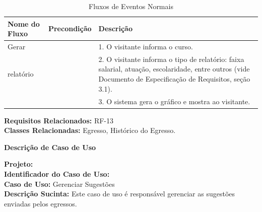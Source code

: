 \begin{table}[h]
	\centering \vspace{0.5cm} \footnotesize
	\caption{Fluxos de Eventos Normais}
	\begin{tabular}{|p{2.3cm}|p{1.8cm}|p{10.7cm}|} \hline  \rowcolor[rgb]{0.8,0.8,0.8}
 					
 		Nome do Fluxo & Precondição & Descrição  \\ \hline		
					
		Gerar    & {} & 1. O visitante informa o curso.  \\
		relatório    & {} & 2. O visitante informa o tipo de relatório: faixa salarial, atuação, escolaridade, entre outros (vide Documento de Especificação de Requisitos, seção 3.1).\\ 
        {} & {} & 3. O sistema gera o gráfico e mostra ao visitante.\\	\hline 
				
	\end{tabular}
\end{table}

\noindent  \textbf{Requisitos Relacionados:} RF-13       \\ \textbf{Classes Relacionadas:} Egresso, Histórico do Egresso.





\newpage
\begin{flushright}    \textbf{Descrição de Caso de Uso}   \end{flushright} 
\noindent \textbf{Projeto:} \imprimirtitulo \\
\textbf{Identificador do Caso de Uso:} \UC\label{uc-sugestao}\\ 
\textbf{Caso de Uso:} Gerenciar Sugestões \\
\noindent \textbf{Descrição Sucinta:} Este caso de uso é responsável gerenciar as sugestões enviadas pelos egressos.\\

